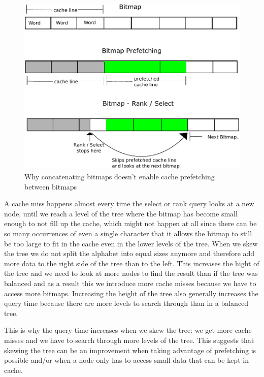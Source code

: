 \begin{figure}
\caption{Why concatenating bitmaps doesn't enable cache prefetching between bitmaps}
\label{fig:QueryPrefetchFigure}
\includegraphics[width=\textwidth]{QueryPrefetchFigure.pdf}
\end{figure}

A cache miss happens almost every time the select or rank query looks at a new node, until we reach a level of the tree where the bitmap has become small enough to not fill up the cache, which might not happen at all since there can be so many occurrences of even a single character that it allows the bitmap to still be too large to fit in the cache even in the lower levels of the tree.
When we skew the tree we do not split the alphabet into equal sizes anymore and therefore add more data to the right side of the tree than to the left. 
This increases the hight of the tree and we need to look at more nodes to find the result than if the tree was balanced and as a result this we introduce more cache misses because we have to access more bitmaps.
Increasing the height of the tree also generally increases the query time because there are more levels to search through than in a balanced tree.

This is why the query time increases when we skew the tree: we get more cache misses and we have to search through more levels of the tree. 
This suggests that skewing the tree can be an improvement when taking advantage of prefetching is possible and/or when a node only has to access small data that can be kept in cache.

